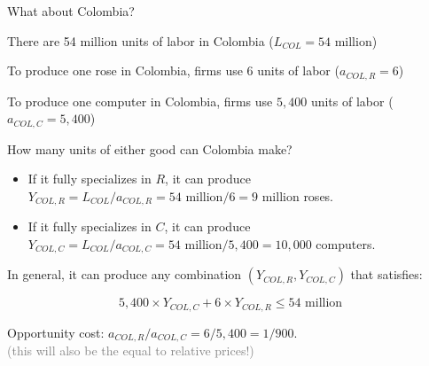 \documentclass[notes,11pt, aspectratio=169, xcolor=table]{beamer}
\newenvironment{wideitemize}{\itemize\addtolength{\itemsep}{10pt}}{\enditemize}
\begin{document}
\begin{frame}{What about Colombia?}
\begin{wideitemize}
        \item There are 54 million units of labor in Colombia ($L_{COL} = 54$ million)
        \item<2-> To produce one rose in Colombia, firms use $6$ units of labor ($a_{COL,R} = 6$)
        \item<3-> To produce one computer in Colombia, firms use $5,400$ units of labor ($a_{COL,C} = 5,400$)
        \item<4-> How many units of either good can Colombia make?
        \begin{itemize}
            \item<4-> If it fully specializes in $R$, it can produce $Y_{COL,R}=L_{COL}/a_{COL,R} = 54 \text{ million}/6 = 9 \text{ million}$ roses.
            \item<4-> If it fully specializes in $C$, it can produce $Y_{COL,C}=L_{COL}/a_{COL,C} = 54 \text{ million}/5,400 = 10,000$ computers.
        \end{itemize}

        \item<5-> In general, it can produce any combination $(Y_{COL,R}, Y_{COL,C})$ that satisfies:

        \begin{equation*}
            5,400 \times Y_{COL,C} + 6 \times Y_{COL,R} \le 54 \text{ million}
        \end{equation*}
        \item<6-> Opportunity cost: $a_{COL,R} / a_{COL,C} = 6 / 5,400 = 1/900$. \\
        \qquad \textcolor{gray}{(this will also be the equal to relative prices!)}
    \end{wideitemize}
\end{frame}
\end{document}
